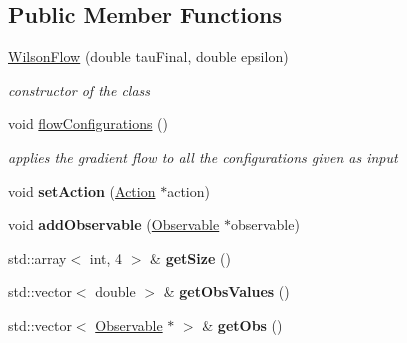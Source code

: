 \subsection*{Public Member Functions}
\begin{DoxyCompactItemize}
\item 
\hyperlink{classWilsonFlow_a0ab55b82c101e093397192bbfa658609}{Wilson\+Flow} (double tau\+Final, double epsilon)
\begin{DoxyCompactList}\small\item\em constructor of the class \end{DoxyCompactList}\item 
void \hyperlink{classWilsonFlow_aff7b61f80cd9d4aa6d19e7281b2016d1}{flow\+Configurations} ()\hypertarget{classWilsonFlow_aff7b61f80cd9d4aa6d19e7281b2016d1}{}\label{classWilsonFlow_aff7b61f80cd9d4aa6d19e7281b2016d1}

\begin{DoxyCompactList}\small\item\em applies the gradient flow to all the configurations given as input \end{DoxyCompactList}\item 
void {\bfseries set\+Action} (\hyperlink{classAction}{Action} $\ast$action)\hypertarget{classWilsonFlow_a6b9ddd40b8165511df3fced3405ed593}{}\label{classWilsonFlow_a6b9ddd40b8165511df3fced3405ed593}

\item 
void {\bfseries add\+Observable} (\hyperlink{classObservable}{Observable} $\ast$observable)\hypertarget{classWilsonFlow_a0298e3a3e1b963c127abca860b61a4a4}{}\label{classWilsonFlow_a0298e3a3e1b963c127abca860b61a4a4}

\item 
std\+::array$<$ int, 4 $>$ \& {\bfseries get\+Size} ()\hypertarget{classWilsonFlow_ad00fa2dc5a90ae26bef6cd99ec90edc0}{}\label{classWilsonFlow_ad00fa2dc5a90ae26bef6cd99ec90edc0}

\item 
std\+::vector$<$ double $>$ \& {\bfseries get\+Obs\+Values} ()\hypertarget{classWilsonFlow_adcdb166df76bbc40c0076f326a431314}{}\label{classWilsonFlow_adcdb166df76bbc40c0076f326a431314}

\item 
std\+::vector$<$ \hyperlink{classObservable}{Observable} $\ast$ $>$ \& {\bfseries get\+Obs} ()\hypertarget{classWilsonFlow_a7105cd0a7a50a6775aadf9f717ff3478}{}\label{classWilsonFlow_a7105cd0a7a50a6775aadf9f717ff3478}


\end{DoxyCompactItemize}
